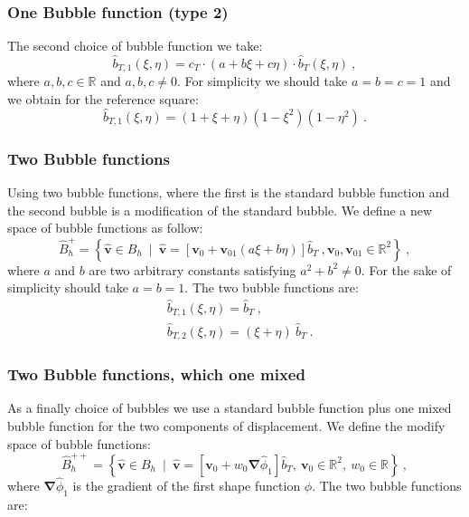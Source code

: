 \documentclass[preprint,12pt,authoryear]{elsarticle}
\begin{document}
\subsubsection{One Bubble function (type 2)}
The second choice of bubble function we take:
\begin{equation}\label{eq:bubble_2}
\hat{b}_{T,1}(\xi,\eta) = c_{T}\cdot (a+b\xi+c\eta)\cdot 
\hat{b}_{T}(\xi,\eta)\:,
\end{equation}
where $a,b,c \in \mathbb{R}$ and $a,b,c \neq 0$.
For simplicity we should take $a=b=c=1$ and we obtain for the reference square:
\begin{equation}\label{eq:bubble_2_ref}
\hat{b}_{T,1}(\xi,\eta) = (1+\xi+\eta)(1-\xi^{2})(1-\eta^{2})\:.
\end{equation} 

\subsubsection{Two Bubble functions}
Using two bubble functions, where the first is the standard bubble function and the second bubble is a modification of the standard bubble. 
We define a new space of bubble functions as follow:
\begin{equation}
\hat{B}^{+}_{h}=\left\lbrace \hat{\bm{v}} \in B_{h} \: \mid \: \hat{\bm{v}}=\left[\bm{v}_{0} + 
\bm{v}_{01} (a\xi + b\eta)\right]\hat{b}_{T}\:, \bm{v}_{0},\bm{v}_{01}\in \mathbb{R}^{2} \right\rbrace \:, 
\end{equation}
where $a$ and $b$ are two arbitrary constants satisfying $a^{2}+b^{2}\neq 0$.
For the sake of simplicity should take $a=b=1$.
The two bubble functions are:
\begin{equation}\label{eq:bubble_3}
\begin{split}
&\hat{b}_{T,1}(\xi,\eta) = \hat{b}_{T}\:, \\
&\hat{b}_{T,2}(\xi,\eta) = (\xi+\eta)\: \hat{b}_{T}\:.
\end{split}
\end{equation}

\subsubsection{Two Bubble functions, which one mixed}
As a finally choice of bubbles we use a standard bubble function plus one mixed bubble function for the two components of displacement.
We define the modify space of bubble functions:
\begin{equation}
\hat{B}^{++}_{h}=\left\lbrace \hat{\bm{v}} \in B_{h} \: \mid \: \hat{\bm{v}}=\left[\bm{v}_{0} + 
w_{0} \bm{\nabla}\hat{\phi}_{1}\right]\hat{b}_{T},\: \bm{v}_{0}\in \mathbb{R}^{2}, \: w_{0}\in \mathbb{R} \right\rbrace \:, 
\end{equation}
where $\bm{\nabla}\hat{\phi}_{1}$ is the gradient of the first shape function 
$\hat{\phi}$.
The two bubble functions are:
\end{document}
